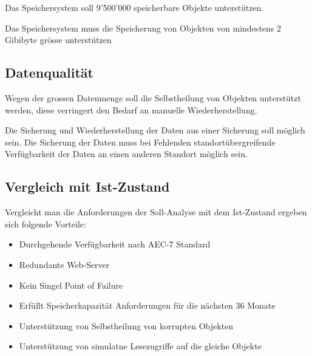 Das Speichersystem soll 9'500'000 speicherbare Objekte unterstützen.

Das Speichersystem muss die Speicherung von Objekten von mindestens 2 Gibibyte grösse unterstützen

\subsection{Datenqualität}
Wegen der grossen Datenmenge soll die Selbstheilung von Objekten unterstützt werden, diese verringert den Bedarf an manuelle Wiederherstellung.

Die Sicherung und Wiederherstellung der Daten aus einer Sicherung soll möglich sein. Die Sicherung der Daten muss bei Fehlenden standortübergreifende Verfügbarkeit der Daten an einen anderen Standort möglich sein.

\subsection{Vergleich mit Ist-Zustand}
Vergleicht man die Anforderungen der Soll-Analyse mit dem Ist-Zustand ergeben sich folgende Vorteile:

\begin{itemize}
\item Durchgehende Verfügbarkeit nach AEC-7 Standard
\item Redundante Web-Server
\item Kein Singel Point of Failure
\item Erfüllt Speicherkapazität Anforderungen für die nächsten 36 Monate
\item Unterstützung von Selbstheilung von korrupten Objekten
\item Unterstützung von simulatne Lesezugriffe auf die gleiche Objekte
\end{itemize}